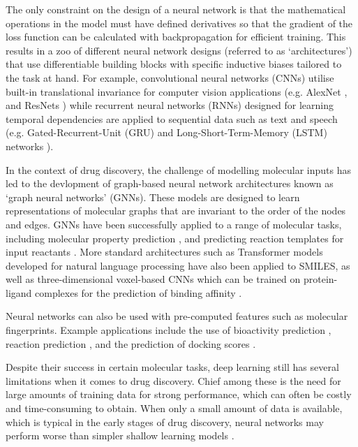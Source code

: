 The only constraint on the design of a neural network is that the mathematical operations in the model must have defined derivatives so that the gradient of the loss function can be calculated with backpropagation for efficient training. This results in a zoo of different neural network designs (referred to as `architectures') that use differentiable building blocks with specific inductive biases tailored to the task at hand. For example, convolutional neural networks (CNNs) utilise built-in translational invariance for computer vision applications (e.g. AlexNet \cite{Krizhevsky2012AlexNet}, and ResNets \cite{He2015ResNet}) while recurrent neural networks (RNNs) designed for learning temporal dependencies are applied to sequential data such as text \cite{Cho2014RNN} and speech \cite{Lipton2015RNN} (e.g. Gated-Recurrent-Unit (GRU) \cite{Chung2014GRU} and Long-Short-Term-Memory (LSTM) networks \cite{Hochreiter1997LSTM}). 

In the context of drug discovery, the challenge of modelling molecular inputs has led to the devlopment of graph-based neural network architectures known as `graph neural networks' (GNNs). These models are designed to learn representations of molecular graphs that are invariant to the order of the nodes and edges. GNNs have been successfully applied to a range of molecular tasks, including molecular property prediction \cite{wu2017molnet,Gilmer17mpnn, Mayr2018compare, yang2019chemprop}, and predicting reaction templates for input reactants \cite{Coley19WLDN5}. More standard architectures such as Transformer models developed for natural language processing have also been applied to SMILES, as well as three-dimensional voxel-based CNNs which can be trained on protein-ligand complexes for the prediction of binding affinity \cite{Ragoza2017ProteinCNN,Imrie2018ProteinCNN,Jimenez2018Kdeep}.

Neural networks can also be used with pre-computed features such as molecular fingerprints. Example applications include the use of bioactivity prediction \cite{Bender2019}, reaction prediction \cite{Wei2016reactionprediction, segler2017neural}, and the prediction of docking scores \cite{Gentile2020deepdocking}.

Despite their success in certain molecular tasks, deep learning still has several limitations when it comes to drug discovery. Chief among these is the need for large amounts of training data for strong performance, which can often be costly and time-consuming to obtain. When only a small amount of data is available, which is typical in the early stages of drug discovery, neural networks may perform worse than simpler shallow learning models \cite{Jiang2021benchmark}. 

